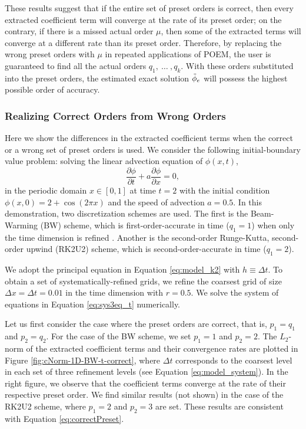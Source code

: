 These results suggest that if the entire set of preset orders is correct, then every extracted coefficient term will converge at the rate of its preset order; on the contrary, if there is a missed actual order $\mu$, then some of the extracted terms will converge at a different rate than its preset order. Therefore, by replacing the wrong preset orders with $\mu$ in repeated applications of POEM, the user is guaranteed to find all the actual orders $q_1,\ \dots \ , q_k$. With these orders substituted into the preset orders, the estimated exact solution $\Tilde{\phi}_e$ will possess the highest possible order of accuracy.


\subsubsection{Realizing Correct Orders from Wrong Orders} \label{subsubsec:realize_correct}
Here we show the differences in the extracted coefficient terms when the correct or a wrong set of preset orders is used. We consider the following initial-boundary value problem: solving the linear advection equation of $\phi(x,t)$,
\begin{equation}
    \frac{\partial \phi}{\partial t} + a \frac{\partial \phi}{\partial x} = 0,
\end{equation}
in the periodic domain $x \in [0,1]$ at time $t=2$ with the initial condition $\phi(x,0) = 2 + \cos(2 \pi x)$ and the speed of advection $a = 0.5$. In this demonstration, two discretization schemes are used. The first is the Beam-Warming (BW) scheme, which is first-order-accurate in time ($q_1 = 1$) when only the time dimension is refined \citep{Love2013}. Another is the second-order Runge-Kutta, second-order upwind (RK2U2) scheme, which is second-order-accurate in time ($q_1 = 2$).

We adopt the principal equation in Equation \ref{eq:model_k2} with $h \equiv \Delta t$. To obtain a set of systematically-refined grids, we refine the coarsest grid of size $\Delta x = \Delta t = 0.01$ in the time dimension with $r = 0.5$. We solve the system of equations in Equation \ref{eq:sys3eq_t} numerically.

Let us first consider the case where the preset orders are correct, that is, $p_1 = q_1$ and $p_2 = q_2$. For the case of the BW scheme, we set $p_1 = 1$ and $p_2 = 2$. The $L_2$-norm of the extracted coefficient terms and their convergence rates are plotted in Figure \ref{fig:cNorm-1D-BW-t-correct}, where $\Delta t$ corresponds to the coarsest level in each set of three refinement levels (see Equation \ref{eq:model_system}). In the right figure, we observe that the coefficient terms converge at the rate of their respective preset order. We find similar results (not shown) in the case of the RK2U2 scheme, where $p_1 = 2$ and $p_2 = 3$ are set. These results are consistent with Equation \ref{eq:correctPreset}.

